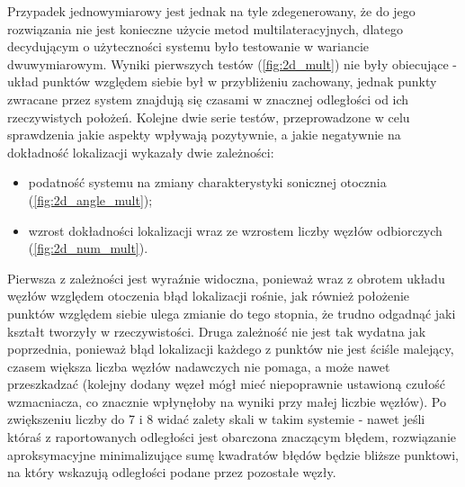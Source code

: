 Przypadek jednowymiarowy jest jednak na tyle zdegenerowany, że do jego rozwiązania nie jest konieczne użycie metod multilateracyjnych, dlatego decydującym o użyteczności systemu było testowanie w wariancie dwuwymiarowym. Wyniki pierwszych testów (\ref{fig:2d_mult}) nie były obiecujące {-} układ punktów względem siebie był w przybliżeniu zachowany, jednak punkty zwracane przez system znajdują się czasami w znacznej odległości od ich rzeczywistych położeń. Kolejne dwie serie testów, przeprowadzone w celu sprawdzenia jakie aspekty wpływają pozytywnie, a jakie negatywnie na dokładność lokalizacji wykazały dwie zależności:
\begin{itemize}
    \item podatność systemu na zmiany charakterystyki sonicznej otocznia (\ref{fig:2d_angle_mult});
    \item wzrost dokładności lokalizacji wraz ze wzrostem liczby węzłów odbiorczych (\ref{fig:2d_num_mult}).
\end{itemize}
Pierwsza z zależności jest wyraźnie widoczna, ponieważ wraz z obrotem układu węzłów względem otoczenia błąd lokalizacji rośnie, jak również położenie punktów względem siebie ulega zmianie do tego stopnia, że trudno odgadnąć jaki kształt tworzyły w rzeczywistości. Druga zależność nie jest tak wydatna jak poprzednia, ponieważ błąd lokalizacji każdego z punktów nie jest ściśle malejący, czasem większa liczba węzłów nadawczych nie pomaga, a może nawet przeszkadzać (kolejny dodany węzeł mógł mieć niepoprawnie ustawioną czułość wzmacniacza, co znacznie wpłynęłoby na wyniki przy małej liczbie węzłów). Po zwiększeniu liczby do 7 i 8 widać zalety skali w takim systemie {-} nawet jeśli któraś z raportowanych odległości jest obarczona znaczącym błędem, rozwiązanie aproksymacyjne minimalizujące sumę kwadratów błędów będzie bliższe punktowi, na który wskazują odległości podane przez pozostałe węzły.
